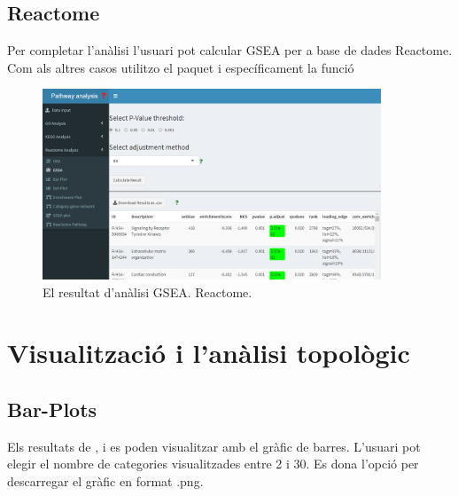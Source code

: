 \subsection{Reactome}
Per completar l'anàlisi l'usuari pot calcular \gls{GSEA} per a base de dades Reactome. Com als altres casos utilitzo el paquet  i específicament la funció 

\begin{figure}[H]
\centering
\includegraphics[width=0.9\textwidth]{figures/App_F13_Items_RA_GSEA.png} 
\caption{El resultat d'anàlisi \gls{GSEA}. Reactome.}
\end{figure}

\section{Visualització i l'anàlisi topològic}

\subsection{\gls{Bar-Plot}s}
Els resultats de ,  i  es poden visualitzar amb el gràfic de barres. L'usuari pot elegir el nombre de categories visualitzades entre 2 i 30. Es dona l'opció per descarregar el gràfic en format .png.


